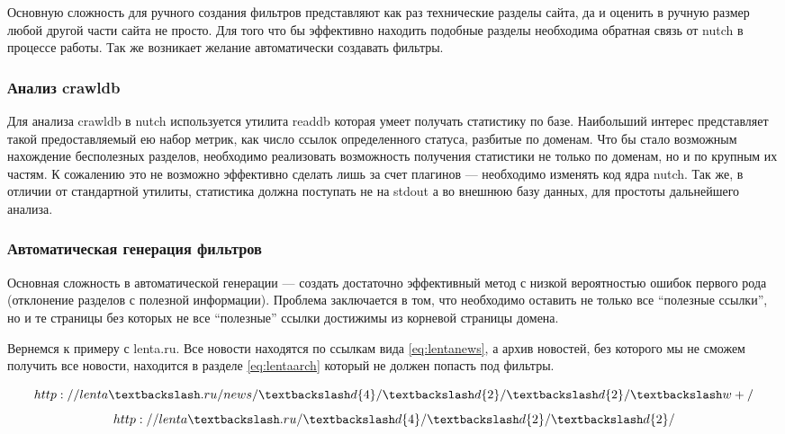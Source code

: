 Основную сложность для ручного создания фильтров представляют как раз технические разделы сайта, да и оценить в ручную размер любой другой части сайта не просто. Для того что бы эффективно находить подобные разделы необходима обратная связь от nutch в процессе работы. Так же возникает желание автоматически создавать фильтры.

\subsubsection*{Анализ crawldb}
Для анализа crawldb в nutch используется утилита readdb которая умеет получать статистику по базе. Наибольший интерес представляет такой предоставляемый ею набор метрик, как число ссылок определенного статуса, разбитые по доменам. Что бы стало возможным нахождение бесполезных разделов, необходимо реализовать возможность получения статистики не только по доменам, но и по крупным их частям. К сожалению это не возможно эффективно сделать лишь за счет плагинов --- необходимо изменять код ядра nutch. Так же, в отличии от стандартной утилиты, статистика должна поступать не на stdout а во внешнюю базу данных, для простоты дальнейшего анализа.

\subsubsection*{Автоматическая генерация фильтров}
Основная сложность в автоматической генерации --- создать достаточно эффективный метод с низкой вероятностью ошибок первого рода (отклонение разделов с полезной информации). Проблема заключается в том, что необходимо оставить не только все ``полезные ссылки'', но и те страницы без которых не все ``полезные'' ссылки достижимы из корневой страницы домена. 

Вернемся к примеру с lenta.ru. Все новости находятся по ссылкам вида \ref{eq:lentanews}, а архив новостей, без которого мы не сможем получить все новости, находится в разделе \ref{eq:lentaarch} который не должен попасть под фильтры.

\begin{equation}\label{eq:lentanews}
http://lenta\textbackslash.ru/news/\textbackslash d\{4\}/\textbackslash d\{2\}/\textbackslash d\{2\}/\textbackslash w+/
\end{equation}
\begin{equation}\label{eq:lentaarch}
 http://lenta\textbackslash.ru/\textbackslash d\{4\}/\textbackslash d\{2\}/\textbackslash d\{2\}/ 
\end{equation}

